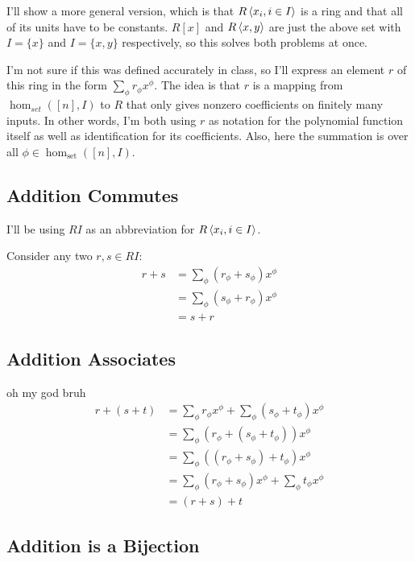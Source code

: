 \documentclass[12pt]{article}
\begin{document}
I'll show a more general version, which is that $R\braket{x_i, i \in I}$ is a ring
and that all of its units have to be constants.
$R[x]$ and $R\braket{x, y}$ are just the above set with $I=\{x\}$ and $I=\{x, y\}$
respectively, so this solves both problems at once.

I'm not sure if this was defined accurately in class,
so I'll express an element $r$ of this ring in the form $\sum_{\phi} r_\phi x^\phi$.
The idea is that $r$ is a mapping from $\hom_{set}([n], I)$ to $R$
that only gives nonzero coefficients on finitely many inputs.
In other words, I'm both using $r$ as notation for the polynomial function itself
as well as identification for its coefficients.
Also, here the summation is over all $\phi \in \hom_{\text{set}}([n], I)$.

\subsection{Addition Commutes}

I'll be using $RI$ as an abbreviation for $R\braket{x_i, i \in I}$.

Consider any two $r, s \in RI$:
\begin{align*}
  r+s
  &= \sum_{\phi} \left(r_\phi+s_\phi\right)x^\phi \\
  &= \sum_{\phi} \left(s_\phi+r_\phi\right)x^\phi \\
  &= s+r
\end{align*}

\subsection{Addition Associates}

oh my god bruh
\begin{align*}
  r+(s+t)
  &= \sum_{\phi} r_\phi x^\phi+\sum_{\phi} \left(s_\phi+t_\phi\right)x^\phi \\
  &= \sum_{\phi} \left(r_\phi+(s_\phi+t_\phi)\right)x^\phi \\
  &= \sum_{\phi} \left((r_\phi+s_\phi)+t_\phi\right)x^\phi \\
  &= \sum_{\phi} (r_\phi+s_\phi) x^\phi+\sum_{\phi} t_\phi x^\phi \\
  &=(r+s)+t
\end{align*}

\subsection{Addition is a Bijection}
\end{document}
